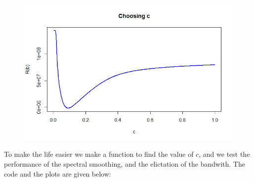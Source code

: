 \documentclass{article}\usepackage[]{graphicx}\usepackage[]{color}
\begin{document}
\begin{figure}[htbp]
\centering
\includegraphics[scale = 0.2]{Plots/Choosing_c.png}
\end{figure}

To make the life easier we make a function to find the value of $c$, and we test the performance of the spectral smoothing, and the elictation of the bandwith. The code and the plots are given below:
\end{document}
